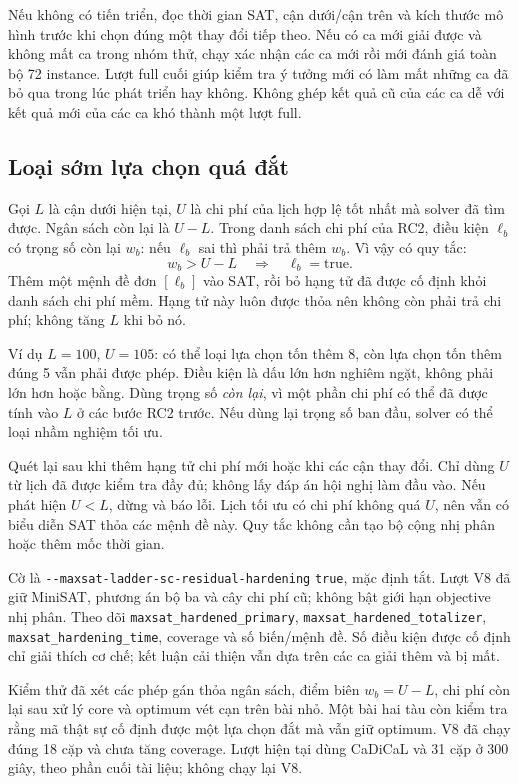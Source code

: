 \documentclass[11pt,a4paper]{article}
\newcommand{\code}[1]{\texttt{#1}}
\newcommand{\file}[1]{\nolinkurl{#1}}
\begin{document}
Nếu không có tiến triển, đọc thời gian SAT, cận dưới/cận trên và kích thước
mô hình trước khi chọn đúng một thay đổi tiếp theo. Nếu có ca mới giải được
và không mất ca trong nhóm thử, chạy xác nhận các ca mới rồi mới đánh giá
toàn bộ 72 instance. Lượt full cuối giúp kiểm tra ý tưởng mới có làm mất
những ca đã bỏ qua trong lúc phát triển hay không. Không ghép kết quả cũ
của các ca dễ với kết quả mới của các ca khó thành một lượt full.

\subsection{Loại sớm lựa chọn quá đắt}

Gọi $L$ là cận dưới hiện tại, $U$ là chi phí của lịch hợp lệ tốt nhất mà
solver đã tìm được. Ngân sách còn lại là $U-L$. Trong danh sách chi phí của
RC2, điều kiện $\ell_b$ có trọng số còn lại $w_b$: nếu $\ell_b$ sai thì phải
trả thêm $w_b$. Vì vậy có quy tắc:
\[
w_b>U-L\quad\Longrightarrow\quad\ell_b=\mathrm{true}.
\]
Thêm một mệnh đề đơn $[\ell_b]$ vào SAT, rồi bỏ hạng tử đã được cố định khỏi
danh sách chi phí mềm. Hạng tử này luôn được thỏa nên không còn phải trả
chi phí; không tăng $L$ khi bỏ nó.

Ví dụ $L=100$, $U=105$: có thể loại lựa chọn tốn thêm 8, còn lựa chọn tốn
thêm đúng 5 vẫn phải được phép. Điều kiện là dấu lớn hơn nghiêm ngặt, không
phải lớn hơn hoặc bằng. Dùng trọng số \emph{còn lại}, vì một phần chi phí
có thể đã được tính vào $L$ ở các bước RC2 trước. Nếu dùng lại trọng số ban
đầu, solver có thể loại nhầm nghiệm tối ưu.

Quét lại sau khi thêm hạng tử chi phí mới hoặc khi các cận thay đổi. Chỉ
dùng $U$ từ lịch đã được kiểm tra đầy đủ; không lấy đáp án hội nghị làm
đầu vào. Nếu phát hiện $U<L$, dừng và báo lỗi. Lịch tối ưu có chi phí không
quá $U$, nên vẫn có biểu diễn SAT thỏa các mệnh đề này. Quy tắc không cần
tạo bộ cộng nhị phân hoặc thêm mốc thời gian.

Cờ là \file{--maxsat-ladder-sc-residual-hardening} \code{true}, mặc định
tắt. Lượt V8 đã giữ MiniSAT, phương án bộ ba và cây chi phí cũ; không bật
giới hạn objective nhị phân. Theo dõi \code{maxsat\_hardened\_primary},
\code{maxsat\_hardened\_totalizer}, \code{maxsat\_hardening\_time},
coverage và số biến/mệnh đề. Số điều kiện được cố định chỉ giải thích cơ
chế; kết luận cải thiện vẫn dựa trên các ca giải thêm và bị mất.

Kiểm thử đã xét các phép gán thỏa ngân sách, điểm biên $w_b=U-L$, chi phí
còn lại sau xử lý core và optimum vét cạn trên bài nhỏ. Một bài hai tàu
còn kiểm tra rằng mã thật sự cố định được một lựa chọn đắt mà vẫn giữ
optimum. V8 đã chạy đúng 18 cặp và chưa tăng coverage. Lượt hiện tại dùng
CaDiCaL và 31 cặp ở 300 giây, theo phần cuối tài liệu; không chạy lại V8.
\end{document}
